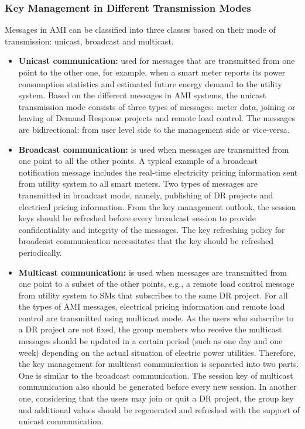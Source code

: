 \subsubsection{Key Management in Different Transmission Modes}
Messages in AMI can be classified into three classes based on their mode of transmission: unicast, broadcast and multicast.
\begin{itemize}
\item \textbf{Unicast communication:} used for messages that are transmitted from one point to the other one, for example, when a smart meter reports its power consumption statistics and estimated future energy demand to the utility system. Based on the different messages in AMI systems, the unicast transmission mode consists of three types of messages: meter data, joining or leaving of Demand Response projects and remote load control. The messages are bidirectional: from user level side to the management side or vice-versa.
\item \textbf{Broadcast communication:} is used when messages are transmitted from one point to all the other points. A typical example of a broadcast notification message includes the real-time electricity pricing information sent from utility system to all smart meters. Two types of messages are transmitted in broadcast mode, namely, publishing of DR projects and electrical pricing information. From the key management outlook, the session keys should be refreshed before every broadcast session to provide confidentiality and integrity of the messages. The key refreshing policy for broadcast communication necessitates that the key should be refreshed periodically.  
\item \textbf{Multicast communication:} is used when messages are transmitted from one point to a subset of the other points, e.g., a remote load control message from utility system to SMs that subscribes to the same DR project. For all the types of AMI messages, electrical pricing information and remote load control are transmitted using multicast mode. As the users who subscribe to a DR project are not fixed, the group members who receive the multicast messages should be updated in a certain period (such as one day and one week) depending on the actual situation of electric power utilities. Therefore, the key management for multicast communication is separated into two parts. One is similar to the broadcast communication. The session key of multicast communication also should be generated before every new session. In another one, considering that the users may join or quit a DR project, the group key and additional values should be regenerated and refreshed with the support of unicast communication. 
\end{itemize}

